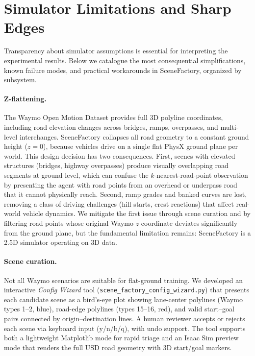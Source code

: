 \section{Simulator Limitations and Sharp Edges}
\label{app:sharp_edges}

Transparency about simulator assumptions is essential for interpreting the experimental results.
Below we catalogue the most consequential simplifications, known failure modes, and practical workarounds in SceneFactory, organized by subsystem.

\paragraph{Z-flattening.}
The Waymo Open Motion Dataset provides full 3D polyline coordinates, including road elevation changes across bridges, ramps, overpasses, and multi-level interchanges.
SceneFactory collapses all road geometry to a constant ground height ($z{=}0$), because vehicles drive on a single flat PhysX ground plane per world.
This design decision has two consequences.
First, scenes with elevated structures (bridges, highway overpasses) produce visually overlapping road segments at ground level, which can confuse the $k$-nearest-road-point observation by presenting the agent with road points from an overhead or underpass road that it cannot physically reach.
Second, ramp grades and banked curves are lost, removing a class of driving challenges (hill starts, crest reactions) that affect real-world vehicle dynamics.
We mitigate the first issue through scene curation and by filtering road points whose original Waymo $z$ coordinate deviates significantly from the ground plane, but the fundamental limitation remains: SceneFactory is a 2.5D simulator operating on 3D data.

\paragraph{Scene curation.}
Not all Waymo scenarios are suitable for flat-ground training.
We developed an interactive \emph{Config Wizard} tool (\texttt{scene\_factory\_config\_wizard.py}) that presents each candidate scene as a bird's-eye plot showing lane-center polylines (Waymo types 1--2, blue), road-edge polylines (types 15--16, red), and valid start--goal pairs connected by origin--destination lines.
A human reviewer accepts or rejects each scene via keyboard input (y/n/b/q), with undo support.
The tool supports both a lightweight Matplotlib mode for rapid triage and an Isaac Sim preview mode that renders the full USD road geometry with 3D start/goal markers.

